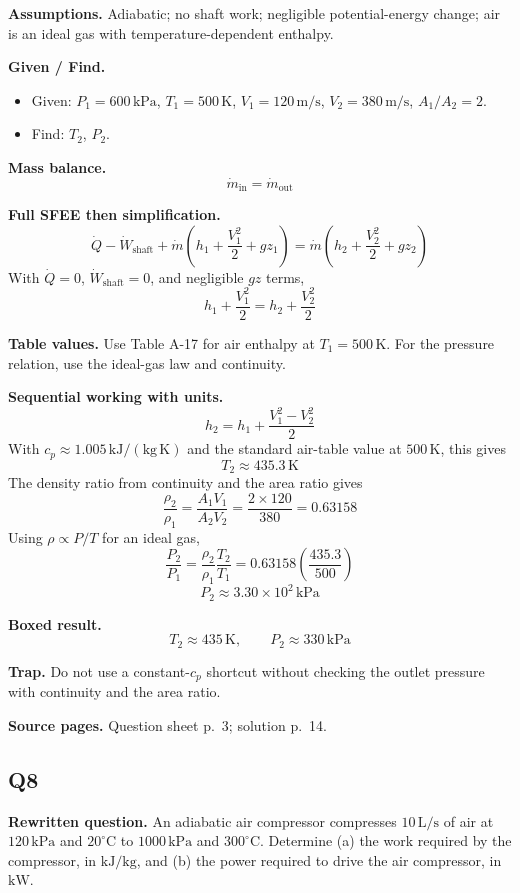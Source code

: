 \textbf{Assumptions.} Adiabatic; no shaft work; negligible potential-energy change; air is an ideal gas with temperature-dependent enthalpy.

\textbf{Given / Find.}
\begin{itemize}
  \item Given: $P_1=600\,\text{kPa}$, $T_1=500\,\text{K}$, $V_1=120\,\text{m/s}$, $V_2=380\,\text{m/s}$, $A_1/A_2=2$.
  \item Find: $T_2$, $P_2$.
\end{itemize}

\textbf{Mass balance.}
\[
\dot m_{\text{in}}=\dot m_{\text{out}}
\]

\textbf{Full SFEE then simplification.}
\[
\dot Q-\dot W_{\text{shaft}}+\dot m\left(h_1+\frac{V_1^2}{2}+gz_1\right)
=\dot m\left(h_2+\frac{V_2^2}{2}+gz_2\right)
\]
With $\dot Q=0$, $\dot W_{\text{shaft}}=0$, and negligible $gz$ terms,
\[
h_1+\frac{V_1^2}{2}=h_2+\frac{V_2^2}{2}
\]

\textbf{Table values.} Use Table A-17 for air enthalpy at $T_1=500\,\text{K}$. For the pressure relation, use the ideal-gas law and continuity.

\textbf{Sequential working with units.}
\[
h_2=h_1+\frac{V_1^2-V_2^2}{2}
\]
With $c_p\approx 1.005\,\mathrm{kJ/(kg\,K)}$ and the standard air-table value at $500\,\text{K}$, this gives
\[
T_2 \approx 435.3\,\text{K}
\]
The density ratio from continuity and the area ratio gives
\[
\frac{\rho_2}{\rho_1}=\frac{A_1V_1}{A_2V_2}=\frac{2\times 120}{380}=0.63158
\]
Using $\rho\propto P/T$ for an ideal gas,
\[
\frac{P_2}{P_1}=\frac{\rho_2}{\rho_1}\frac{T_2}{T_1}
=0.63158\left(\frac{435.3}{500}\right)
\]
\[
P_2 \approx 3.30\times 10^2\,\text{kPa}
\]

\textbf{Boxed result.}
\[
\boxed{T_2 \approx 435\,\text{K}, \qquad P_2 \approx 330\,\text{kPa}}
\]

\textbf{Trap.} Do not use a constant-$c_p$ shortcut without checking the outlet pressure with continuity and the area ratio.

\textbf{Source pages.} Question sheet p.~3; solution p.~14.

\subsection*{Q8}
\textbf{Rewritten question.} An adiabatic air compressor compresses $10\,\text{L/s}$ of air at $120\,\text{kPa}$ and $20^\circ\text{C}$ to $1000\,\text{kPa}$ and $300^\circ\text{C}$. Determine (a) the work required by the compressor, in $\text{kJ/kg}$, and (b) the power required to drive the air compressor, in $\text{kW}$.

